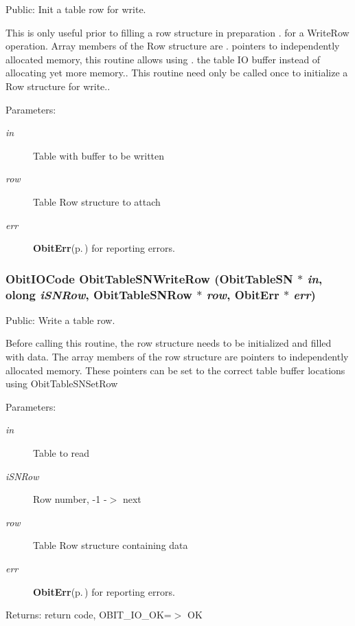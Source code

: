 Public: Init a table row for write. 

This is only useful prior to filling a row structure in preparation . for a Write\-Row operation. Array members of the Row structure are . pointers to independently allocated memory, this routine allows using . the table IO buffer instead of allocating yet more memory.. This routine need only be called once to initialize a Row structure for write.. \begin{Desc}
\item[Parameters:]
\begin{description}
\item[{\em in}]Table with buffer to be written \item[{\em row}]Table Row structure to attach \item[{\em err}]{\bf Obit\-Err}{\rm (p.\,\pageref{structObitErr})} for reporting errors. \end{description}
\end{Desc}
\subsubsection{\setlength{\rightskip}{0pt plus 5cm}Obit\-IOCode Obit\-Table\-SNWrite\-Row ({\bf Obit\-Table\-SN} $\ast$ {\em in}, {\bf olong} {\em i\-SNRow}, {\bf Obit\-Table\-SNRow} $\ast$ {\em row}, {\bf Obit\-Err} $\ast$ {\em err})}\label{ObitTableSN_8h_a20}


Public: Write a table row. 

Before calling this routine, the row structure needs to be initialized and filled with data. The array members of the row structure are pointers to independently allocated memory. These pointers can be set to the correct table buffer locations using Obit\-Table\-SNSet\-Row \begin{Desc}
\item[Parameters:]
\begin{description}
\item[{\em in}]Table to read \item[{\em i\-SNRow}]Row number, -1 -$>$ next \item[{\em row}]Table Row structure containing data \item[{\em err}]{\bf Obit\-Err}{\rm (p.\,\pageref{structObitErr})} for reporting errors. \end{description}
\end{Desc}
\begin{Desc}
\item[Returns:]return code, OBIT\_\-IO\_\-OK=$>$ OK \end{Desc}
